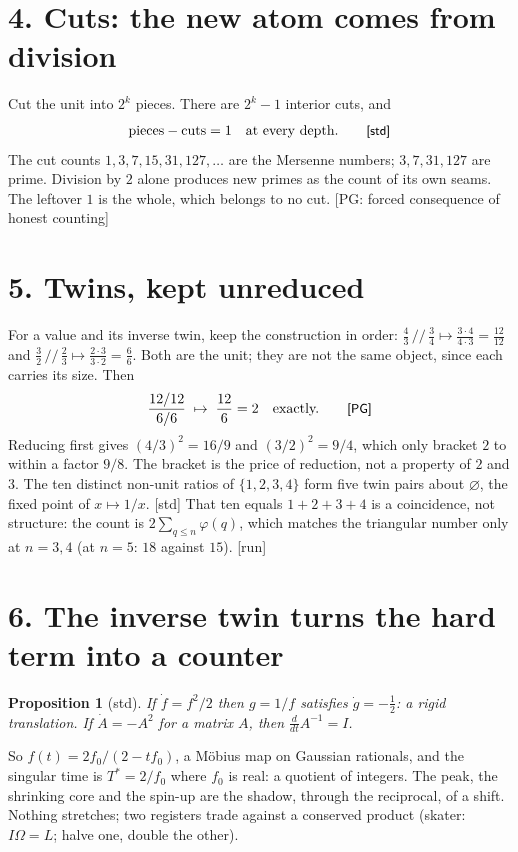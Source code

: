 \documentclass[11pt,a4paper]{article}
\newtheorem{prop}{Proposition}
\newcommand{\stamp}[1]{\textsf{\small[#1]}}
\newcommand{\E}{\varnothing}
\begin{document}
\section*{4. Cuts: the new atom comes from division}
Cut the unit into $2^k$ pieces. There are $2^k-1$ interior cuts, and
\[
\text{pieces}-\text{cuts}=1\quad\text{at every depth.}\qquad\stamp{std}
\]
The cut counts $1,3,7,15,31,127,\dots$ are the Mersenne numbers; $3,7,31,127$ are prime. Division by $2$ alone produces new primes as the count of its own seams. The leftover $1$ is the whole, which belongs to no cut. \stamp{PG: forced consequence of honest counting}

\section*{5. Twins, kept unreduced}
For a value and its inverse twin, keep the construction in order: $\tfrac43\,/\!/\,\tfrac34\mapsto\frac{3\cdot4}{4\cdot3}=\frac{12}{12}$ and $\tfrac32\,/\!/\,\tfrac23\mapsto\frac{2\cdot3}{3\cdot2}=\frac66$. Both are the unit; they are not the same object, since each carries its size. Then
\[
\frac{12/12}{6/6}\;\mapsto\;\frac{12}{6}=2\quad\text{exactly.}\qquad\stamp{PG}
\]
Reducing first gives $(4/3)^2=16/9$ and $(3/2)^2=9/4$, which only bracket $2$ to within a factor $9/8$. The bracket is the price of reduction, not a property of $2$ and $3$. The ten distinct non-unit ratios of $\{1,2,3,4\}$ form five twin pairs about $\E$, the fixed point of $x\mapsto1/x$. \stamp{std} That ten equals $1+2+3+4$ is a coincidence, not structure: the count is $2\sum_{q\le n}\varphi(q)$, which matches the triangular number only at $n=3,4$ (at $n=5$: $18$ against $15$). \stamp{run}

\section*{6. The inverse twin turns the hard term into a counter}
\begin{prop}[std]
If $\dot f=f^2/2$ then $g=1/f$ satisfies $\dot g=-\tfrac12$: a rigid translation. If $\dot A=-A^2$ for a matrix $A$, then $\tfrac{d}{dt}A^{-1}=I$.
\end{prop}
So $f(t)=2f_0/(2-tf_0)$, a M\"obius map on Gaussian rationals, and the singular time is $T^*=2/f_0$ where $f_0$ is real: a quotient of integers. The peak, the shrinking core and the spin-up are the shadow, through the reciprocal, of a shift. Nothing stretches; two registers trade against a conserved product (skater: $I\Omega=L$; halve one, double the other).
\end{document}
